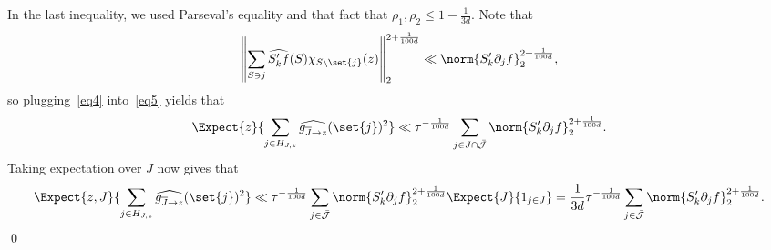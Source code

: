   In the last inequality, we used Parseval's equality and that fact that $\rho_1,\rho_2\leq 1-\frac{1}{3d}$.
%
%
%
%
%
%
%
%
%
%
  Note that
  \[
  \left\|\sum\limits_{S\ni j}\widehat{S_k' f}(S)\chi_{S\setminus\set{j}}(z)\right\|_2^{2+\frac{1}{100d}}
  \ll \norm{S_k' \partial_j f}_2^{2+\frac{1}{100d}},
  \]
  so plugging~\eqref{eq4} into~\eqref{eq5} yields that
  \[
  \Expect{z}{\sum\limits_{j\in H_{J,z}}\widehat{g_{\overline{J}\rightarrow z}}(\set{j})^2}\ll
  \tau^{-\frac{1}{100d}}\sum\limits_{j\in J\cap\bar{\mathcal{J}}}\norm{S_k' \partial_j f}_2^{2+\frac{1}{100d}}.
  \]
  Taking expectation over $J$ now gives that
  \[
  \Expect{z,J}{\sum\limits_{j\in H_{J,z}}\widehat{g_{\overline{J}\rightarrow z}}(\set{j})^2}
  \ll
  \tau^{-\frac{1}{100d}}\sum\limits_{j\in\bar{\mathcal{J}}} \norm{S_k' \partial_j f}_2^{2+\frac{1}{100d}} \Expect{J}{1_{j\in J}}
  = \frac{1}{3d}\tau^{-\frac{1}{100d}}\sum\limits_{j\in\bar{\mathcal{J}}} \norm{S_k' \partial_j f}_2^{2+\frac{1}{100d}}.
  \]
\qed
